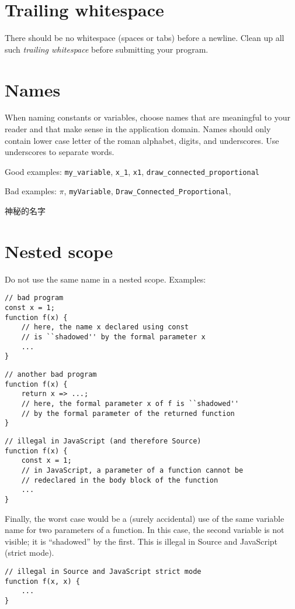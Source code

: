 \section*{Trailing whitespace}

There should be no whitespace (spaces or tabs) before a newline.
Clean up all such \emph{trailing whitespace} before submitting your program.

\section*{Names}

When naming constants or variables, choose names that are meaningful to your
reader and that make sense in the application domain.
Names should only contain
lower case letter of the roman alphabet, digits, and
underscores. Use underscores to separate words. 

Good examples: \lstinline{my_variable}, \lstinline{x_1}, \lstinline{x1},
\lstinline{draw_connected_proportional}

Bad examples: $\pi$, \lstinline{myVariable}, \lstinline{Draw_Connected_Proportional},
\begin{CJK*}{UTF8}{gbsn}
神秘的名字
\end{CJK*}

\section*{Nested scope}
Do not use the same name in a nested scope. Examples:
\begin{lstlisting}
// bad program
const x = 1;
function f(x) {
    // here, the name x declared using const
    // is ``shadowed'' by the formal parameter x
    ...
}
\end{lstlisting}

\begin{lstlisting}
// another bad program
function f(x) {
    return x => ...;
    // here, the formal parameter x of f is ``shadowed'' 
    // by the formal parameter of the returned function
}
\end{lstlisting}

\begin{lstlisting}
// illegal in JavaScript (and therefore Source)
function f(x) {
    const x = 1;
    // in JavaScript, a parameter of a function cannot be 
    // redeclared in the body block of the function
    ...
}
\end{lstlisting}
Finally, the worst case would be a (surely accidental) 
use of the same variable name for two parameters of a function.
In this case, the second variable is not visible; it is ``shadowed''
by the first. This is illegal in Source and JavaScript (strict mode).
\begin{lstlisting}
// illegal in Source and JavaScript strict mode
function f(x, x) {
    ...
}
\end{lstlisting}

